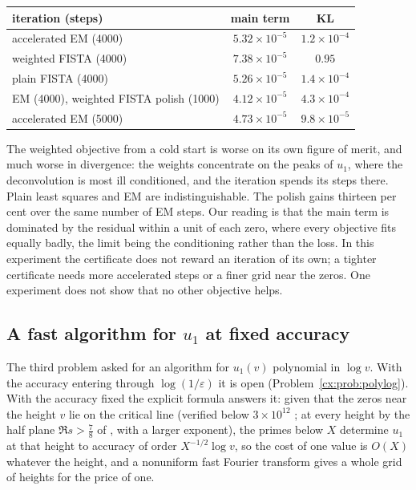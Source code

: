 \begin{center}
\small
\begin{tabular}{lcc}
\toprule
iteration (steps) & main term & KL\\
\midrule
accelerated EM (4000) & $5.32\times10^{-5}$ & $1.2\times10^{-4}$\\
weighted FISTA (4000) & $7.38\times10^{-5}$ & $0.95$\\
plain FISTA (4000) & $5.26\times10^{-5}$ & $1.4\times10^{-4}$\\
EM (4000), weighted FISTA polish (1000) & $4.12\times10^{-5}$ & $4.3\times10^{-4}$\\
accelerated EM (5000) & $4.73\times10^{-5}$ & $9.8\times10^{-5}$\\
\bottomrule
\end{tabular}
\end{center}

\noindent The weighted objective from a cold start is worse on its own figure of merit, and much worse in divergence: the weights concentrate on the peaks of $u_1$, where the deconvolution is most ill conditioned, and the iteration spends its steps there. Plain least squares and EM are indistinguishable. The polish gains thirteen per cent over the same number of EM steps. Our reading is that the main term is dominated by the residual within a unit of each zero, where every objective fits equally badly, the limit being the conditioning rather than the loss. In this experiment the certificate does not reward an iteration of its own; a tighter certificate needs more accelerated steps or a finer grid near the zeros. One experiment does not show that no other objective helps.

\subsection{A fast algorithm for $u_1$ at fixed accuracy}\label{cx:sec:fastu1}

The third problem asked for an algorithm for $u_1(v)$ polynomial in $\log v$. With the accuracy entering through $\log(1/\varepsilon)$ it is open (Problem~\ref{cx:prob:polylog}). With the accuracy fixed the explicit formula answers it: given that the zeros near the height $v$ lie on the critical line (verified below $3\times10^{12}$ \cite{PT21}; at every height by the half plane $\Re s>\tfrac78$ of \cite{OAI26a}, with a larger exponent), the primes below $X$ determine $u_1$ at that height to accuracy of order $X^{-1/2}\log v$, so the cost of one value is $O(X)$ whatever the height, and a nonuniform fast Fourier transform gives a whole grid of heights for the price of one.

